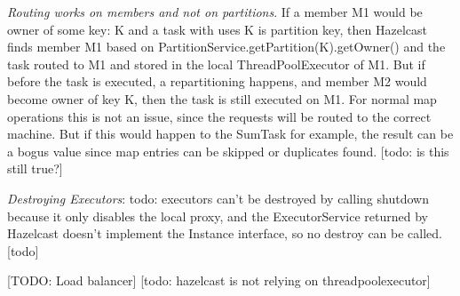 \emph{Routing works on members and not on partitions}. If a member M1 would be owner of some key: K and a task with uses K is partition key, then Hazelcast finds member M1 based on PartitionService.getPartition(K).getOwner() and the task routed to M1 and  stored in the local ThreadPoolExecutor of M1. But if before the task is executed, a repartitioning happens, and member M2 would become owner of key K, then the task is still executed on M1. For normal map operations this is not an issue, since the requests will be routed to the correct machine. But if this would happen to the SumTask for example, the result can be a bogus value since map entries can be skipped or duplicates found. [todo: is this still true?]

\emph{Destroying Executors}: todo: executors can't be destroyed by calling shutdown because it only disables the local proxy, and the ExecutorService returned by Hazelcast doesn't implement the Instance interface, so no destroy can be called.  [todo]

[TODO: Load balancer]
[todo: hazelcast is not relying on threadpoolexecutor]
